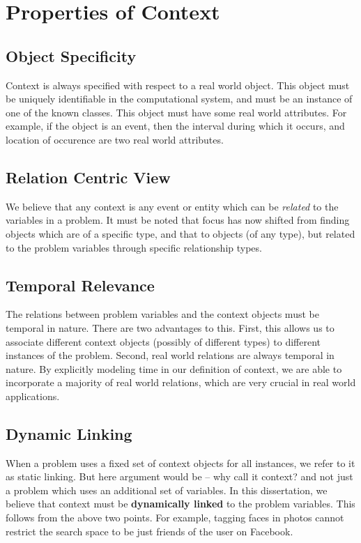 \section{Properties of Context}

\subsection{Object Specificity}
Context is always specified with respect to a real world object. This object must be uniquely identifiable in the computational system, and must be an instance of one of the known classes. This object must have some real world attributes. For example, if the object is an event, then the interval during which it occurs, and location of occurence are two real world attributes.

\subsection{Relation Centric View}
We believe that any context is any event or entity which can be \textit{related} to the variables in a problem. It must be noted that focus has now shifted from finding objects which are of a specific type, and that to objects (of any type), but related to the problem variables through specific relationship types.

\subsection{Temporal Relevance}
The relations between problem variables and the context objects must be temporal in nature. There are two advantages to this. First, this allows us to associate different context objects (possibly of different types) to different instances of the problem. Second, real world relations are always temporal in nature. By explicitly modeling time in our definition of context, we are able to incorporate a majority of real world relations, which are very crucial in real world applications.

\subsection{Dynamic Linking}
When a problem uses a fixed set of context objects for all instances, we refer to it as static linking. But here argument would be -- why call it context? and not just a problem which uses an additional set of variables. In this dissertation, we believe that context must be \textbf{dynamically linked} to the problem variables. This follows from the above two points. For example, tagging faces in photos cannot restrict the search space to be just friends of the user on Facebook. 

